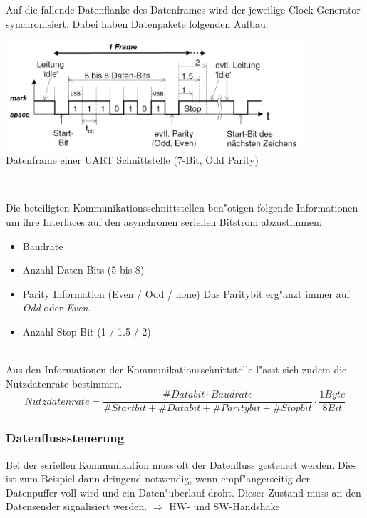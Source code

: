 Auf die fallende Datenflanke des Datenframes wird der jeweilige Clock-Generator synchronisiert. Dabei haben Datenpakete folgenden Aufbau:\\
	\begin{minipage}{11cm}
		\includegraphics[width=11cm]{images/datenframe-uart}\\
		Datenframe einer UART Schnittstelle (7-Bit, Odd Parity)
	\end{minipage}
	\begin{minipage}{0.5cm}
		\-\
	\end{minipage}
	\begin{minipage}{7cm}
		Die beteiligten Kommunikationsschnittstellen ben"otigen folgende Informationen um ihre Interfaces auf den asynchronen seriellen Bitstrom abzustimmen:
		\begin{itemize}
			\item Baudrate
			\item Anzahl Daten-Bits (5 bis 8)
			\item Parity Information (Even / Odd / none) Das Paritybit erg"anzt immer auf \textit{Odd} oder \textit{Even}.
			\item Anzahl Stop-Bit (1 / 1.5 / 2)
		\end{itemize}
	\end{minipage}\\

Aus den Informationen der Kommunikationsschnittstelle l"asst sich zudem die Nutzdatenrate bestimmen.
	\begin{equation*}
		Nutzdatenrate = \frac{\#Databit \cdot Baudrate}{\#Startbit + \#Databit + \#Paritybit + \#Stopbit} \cdot \frac{1 Byte}{8 Bit}
	\end{equation*}
	
\newpage
\subsubsection{Datenflusssteuerung}
Bei der seriellen Kommunikation muss oft der Datenfluss gesteuert werden. Dies ist zum Beispiel dann dringend notwendig, wenn empf"angerseitig der Datenpuffer voll wird und ein Daten"uberlauf droht. Dieser Zustand muss an den Datensender signalisiert werden. $\Rightarrow$ HW- und SW-Handshake\\

